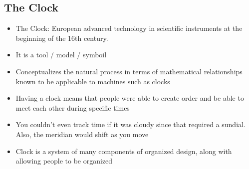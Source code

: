 \documentclass{article}
\begin{document}
\subsection{The Clock}
\begin{itemize}
  \item The Clock: European advanced technology in scientific instruments at the beginning
    of the 16th century.
  \item It is a tool / model / symboil
  \item Conceptualizes the natural process in terms of mathematical relationships known to be
    applicable to machines such as clocks
  \item Having a clock means that people were able to create order and be able to meet each
    other during specific times
  \item You couldn't even track time if it was cloudy since that required a sundial.
    Also, the meridian would shift as you move
  \item Clock is a system of many components of organized design,
    along with allowing people to be organized
\end{itemize}
\end{document}
